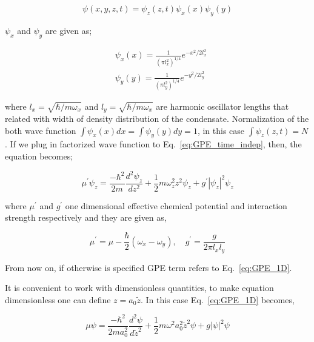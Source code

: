 \documentclass[a4paper,times,12pt]{article}
\begin{document}
\begin{equation}
\label{eq:GPE_time_indep_wave_func_seperated}
\psi(x, y, z, t) = \psi_z(z, t)\psi_x(x)\psi_y(y)
\end{equation}

\noindent $\psi_x$ and $\psi_y$ are given as;

\begin{equation}
\begin{split}
\label{eq:GPE_x_y_wave}
& \psi_x(x) = \frac{1}{{(\pi l_x^2)}^{1/4}}e^{-x^2/2l_x^2} \\
& \psi_y(y) = \frac{1}{{(\pi l_y^2)}^{1/4}}e^{-y^2/2l_y^2}
\end{split}
\end{equation}

\noindent where $l_x = \sqrt{\hbar/m\omega_x}$ and $l_y = \sqrt{\hbar/m\omega_x}$ are harmonic oscillator lengths that related with width of density distribution of the condensate. Normalization of the both wave function $\int \psi_x(x)dx = \int \psi_y(y)dy = 1$, in this case $\int \psi_z(z, t) = N$. If we plug in factorized wave function to Eq.~\ref{eq:GPE_time_indep}, then, the equation becomes;

\begin{equation}
\label{eq:GPE_1D}
\mu^{\prime}\psi_z = \frac{-\hbar^2}{2m}\frac{d^2\psi_z}{dz^2} + \frac{1}{2}m\omega_z^2 z^2\psi_z + g^{\prime}|\psi_z|^2\psi_z 
\end{equation}

\noindent where $\mu^{\prime}$ and $g^{\prime}$ one dimensional effective chemical potential and interaction strength respectively and they are given as,

\begin{equation}
\label{eq:GPE_1D_chem_inter}
\mu^{\prime} = \mu - \frac{\hbar}{2}(\omega_x - \omega_y), \quad g^{\prime} = \frac{g}{2\pi l_x l_y}
\end{equation}

\noindent From now on, if otherwise is specified GPE term refers to Eq.~\ref{eq:GPE_1D}. 

It is convenient to work with dimensionless quantities, to make equation dimensionless one can define $z = a_0\widetilde{z}$. In this case Eq.~\ref{eq:GPE_1D} becomes,

\begin{equation}
\label{eq:GPE_dimensionless_length}
\mu\psi = \frac{-\hbar^2}{2ma_0^2}\frac{d^2\psi}{d\widetilde{z}^2} + \frac{1}{2}m\omega^2 a_0^2 \widetilde{z}^2\psi + g|\psi|^2\psi
\end{equation}
\end{document}
